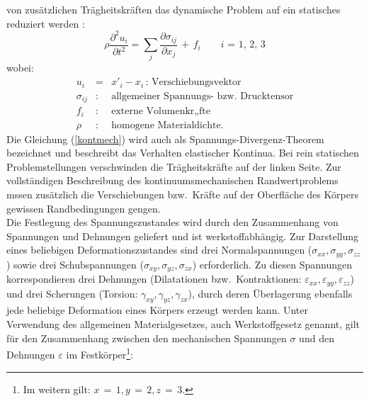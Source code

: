 von zusätzlichen Trägheitskräften das dynamische Problem auf ein statisches
reduziert werden \cite{Som49}:
%
\begin{equation}
\label{kontmech}
 \rho \displaystyle \frac{ \partial^{2}{u_{i}}}{ \partial t^{2}} = 
 \sum_{j} \frac{\partial \sigma_{ij}}{\partial x_{j}} %
 \, + \, f_{i}
 \qquad \mbox{$i$ = 1, 2, 3}
\end{equation}
wobei:
\begin{eqnarray*}
  u_i{}        & = &  x'_{i} - x_{i}
  \, : \, \mbox{Verschiebungsvektor}\\
  \sigma_{ij}  & : & \mbox{allgemeiner Spannungs- bzw. Drucktensor}\\
  f_{i}        & : & \mbox{externe Volumenkr„fte}\\
  \rho    & : & \mbox{homogene Materialdichte.}
\end{eqnarray*}
Die Gleichung (\ref{kontmech}) wird auch als
\glqq Spannungs-Divergenz-Theorem\grqq \, bezeichnet und beschreibt das
Verhalten elastischer Kontinua. Bei rein statischen Problemstellungen
verschwinden die Trägheitskräfte auf der linken Seite.
Zur vollständigen Beschreibung des kontinuumsmechanischen Randwertproblems
mssen zusätzlich die Verschiebungen bzw.\ Kräfte auf
der Oberfläche des Körpers gewissen Randbedingungen gengen.\\
%
Die Festlegung des Spannungszustandes wird durch den Zusammenhang von
Spannungen und Dehnungen geliefert und ist werkstoffabhängig. Zur
Darstellung eines beliebigen Deformationszustandes sind drei Normalspannungen
($ \sigma_{xx}, \sigma_{yy}, \sigma_{zz}$) sowie drei Schubspannungen
($ \sigma_{xy}, \sigma_{yz}, \sigma_{zx} $)
erforderlich. Zu diesen Spannungen korrespondieren drei Dehnungen
(Dilatationen bzw.\ Kontraktionen:
$ \varepsilon_{xx}, \varepsilon_{yy}, \varepsilon_{zz} $)
und drei Scherungen (Torsion: $ \gamma_{xy}, \gamma_{yz}, \gamma_{zx} $),
durch deren Überlagerung ebenfalls jede beliebige Deformation eines Körpers
erzeugt werden kann. Unter Verwendung des allgemeinen Materialgesetzes,
auch Werkstoffgesetz genannt, gilt für den Zusammenhang zwischen den
mechanischen Spannungen  $\sigma$ und den Dehnungen $ \varepsilon $ im
Festkörper\footnote{Im weitern gilt:
$x \, = \, 1, y \, = \, 2, z \, = \, 3$.}:
